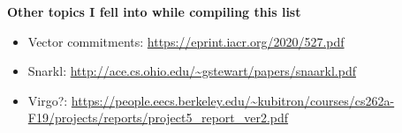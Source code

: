 \vspace*{1em}
{\footnotesize
\hspace*{-1em}\textbf{Other topics I fell into while compiling this list}
\begin{itemize}
	\item Vector commitments: \url{https://eprint.iacr.org/2020/527.pdf}
	\item Snarkl: \url{http://ace.cs.ohio.edu/~gstewart/papers/snaarkl.pdf}
	\item Virgo?: \url{https://people.eecs.berkeley.edu/~kubitron/courses/cs262a-F19/projects/reports/project5_report_ver2.pdf}
\end{itemize} 
}


